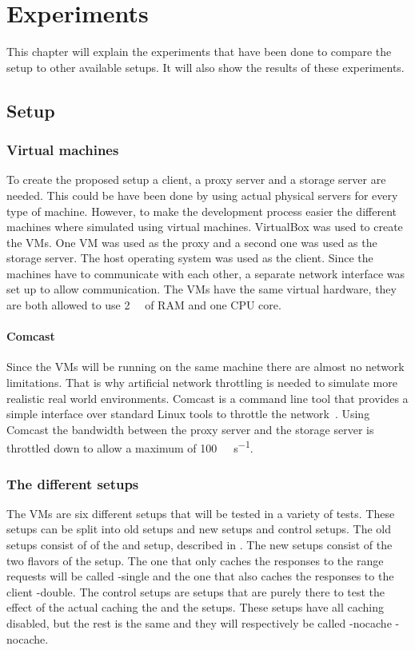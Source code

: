 \documentclass[twoside,openright]{uva-bachelor-thesis}
\newcommand{\mbps}[1]{\SI[per-mode=symbol]{#1}{\mega\bit\per\second}}
\begin{document}
\chapter{Experiments}
This chapter will explain the experiments that have been done to compare the
\lt setup to other available setups. It will also show the results of these
experiments.

\section{Setup}

\subsection{Virtual machines}
To create the proposed setup a client, a proxy server and a storage server are
needed. This could be have been done by using actual physical servers for every
type of machine. However, to make the development process easier the different
machines where simulated using virtual machines. VirtualBox was used to create
the VMs. One VM was used as the proxy and a second one was used as the storage
server. The host operating system was used as the client. Since the machines
have to communicate with each other, a separate network interface was set up to
allow communication. The VMs have the same virtual hardware, they are both
allowed to use \SI{2}{\giga\byte} of RAM and one CPU core.

\subsubsection{Comcast}
Since the VMs will be running on the same machine there are almost no network
limitations. That is why artificial network throttling is needed to simulate
more realistic real world environments. Comcast is a command line tool that
provides a simple interface over standard Linux tools to throttle the
network~\autocite{comcast}. Using Comcast the bandwidth between the proxy server
and the storage server is throttled down to allow a maximum of
\mbps{100}.


\subsection{The different setups}
The VMs are six different setups that will be tested in a variety of tests.
These setups can be split into old setups and new setups and control setups.
The old setups consist of of the \cdn and \ipp setup, described in
. The new setups consist of the two flavors of the \lt
setup. The one that only caches the responses to the range requests will be
called \lt-single and the one that also caches the responses to the client
\lt-double. The control setups are setups that are purely there to test the
effect of the actual caching the \lt and the \cdn setups. These setups have all
caching disabled, but the rest is the same and they will respectively be called
\lt-nocache \cdn-nocache.
\end{document}
